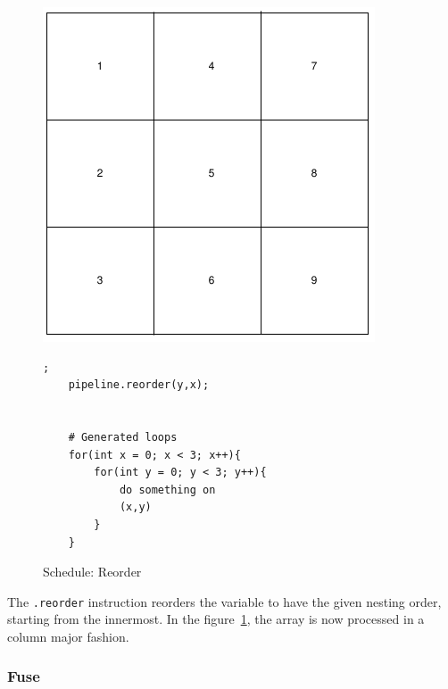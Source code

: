 \begin{figure}[H]

		\begin{minipage}[c]{\EIW}
			\centering
		\includegraphics[width=\textwidth]{Images/Reorder.png}
		\end{minipage}
		\begin{minipage}[c]{\ECW}
			\centering
\begin{lstlisting}[label={code:reorder}];
    pipeline.reorder(y,x);


	# Generated loops
	for(int x = 0; x < 3; x++){
		for(int y = 0; y < 3; y++){
			do something on
			(x,y)
		}
	}
\end{lstlisting}
		\end{minipage}
		\caption{Schedule: Reorder}
		\label{schedule:reorder}
\end{figure}
	
	The \texttt{.reorder} instruction reorders the variable to have the given nesting order, starting from the innermost. In the figure~\ref{schedule:reorder}, the  array is now processed in a column major fashion.

	\subsubsection{Fuse}


